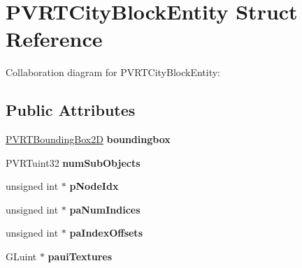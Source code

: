 \hypertarget{struct_p_v_r_t_city_block_entity}{\section{P\+V\+R\+T\+City\+Block\+Entity Struct Reference}
\label{struct_p_v_r_t_city_block_entity}
}


Collaboration diagram for P\+V\+R\+T\+City\+Block\+Entity\+:
\subsection*{Public Attributes}
\begin{DoxyCompactItemize}
\item 
\hypertarget{struct_p_v_r_t_city_block_entity_a390c7da49ccfcc2932ed470ec60398c6}{\hyperlink{struct_p_v_r_t_bounding_box2_d}{P\+V\+R\+T\+Bounding\+Box2\+D} {\bfseries boundingbox}}\label{struct_p_v_r_t_city_block_entity_a390c7da49ccfcc2932ed470ec60398c6}

\item 
\hypertarget{struct_p_v_r_t_city_block_entity_a469fcf1771290a77fdd1b41babc18fa6}{P\+V\+R\+Tuint32 {\bfseries num\+Sub\+Objects}}\label{struct_p_v_r_t_city_block_entity_a469fcf1771290a77fdd1b41babc18fa6}

\item 
\hypertarget{struct_p_v_r_t_city_block_entity_a733819eb9920ebe37d36c5b77dd432ef}{unsigned int $\ast$ {\bfseries p\+Node\+Idx}}\label{struct_p_v_r_t_city_block_entity_a733819eb9920ebe37d36c5b77dd432ef}

\item 
\hypertarget{struct_p_v_r_t_city_block_entity_ad3de6e08961b2648d4e7592dd212f6aa}{unsigned int $\ast$ {\bfseries pa\+Num\+Indices}}\label{struct_p_v_r_t_city_block_entity_ad3de6e08961b2648d4e7592dd212f6aa}

\item 
\hypertarget{struct_p_v_r_t_city_block_entity_a88ec08865a5da94211606ca665b0ff39}{unsigned int $\ast$ {\bfseries pa\+Index\+Offsets}}\label{struct_p_v_r_t_city_block_entity_a88ec08865a5da94211606ca665b0ff39}

\item 
\hypertarget{struct_p_v_r_t_city_block_entity_a74f92c6359dedc2f69646d7ac53d8049}{G\+Luint $\ast$ {\bfseries paui\+Textures}}\label{struct_p_v_r_t_city_block_entity_a74f92c6359dedc2f69646d7ac53d8049}

\end{DoxyCompactItemize}


